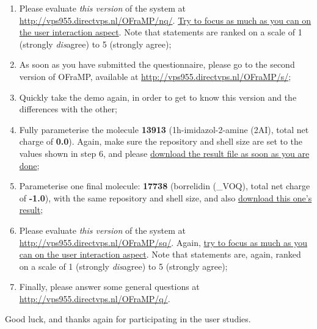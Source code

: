 \begin{enumerate}
\item Please evaluate \emph{this version} of the system at \url{http://vps955.directvps.nl/OFraMP/nq/}. \underline{Try to focus as much as you can on the user interaction aspect}. Note that statements are ranked on a scale of 1 (strongly \emph{dis}agree) to 5 (strongly agree);
\item As soon as you have submitted the questionnaire, please go to the second version of OFraMP, available at \url{http://vps955.directvps.nl/OFraMP/s/};
\item Quickly take the demo again, in order to get to know this version and the differences with the other;
\item Fully parameterise the molecule \textbf{13913} (1h-imidazol-2-amine (2AI), total net charge of \textbf{0.0}). Again, make sure the repository and shell size are set to the values shown in step 6, and please \underline{download the result file as soon as you are done};
\item Parameterise one final molecule: \textbf{17738} (borrelidin (\_VOQ), total net charge of \textbf{-1.0}), with the same repository and shell size, and also \underline{download this one's result};
\item Please evaluate \emph{this version} of the system at \url{http://vps955.directvps.nl/OFraMP/sq/}. Again, \underline{try to focus as much as you can on the user interaction aspect}. Note that statements are, again, ranked on a scale of 1 (strongly \emph{dis}agree) to 5 (strongly agree);
\item Finally, please answer some general questions at \url{http://vps955.directvps.nl/OFraMP/q/}.
\end{enumerate}
Good luck, and thanks again for participating in the user studies.

